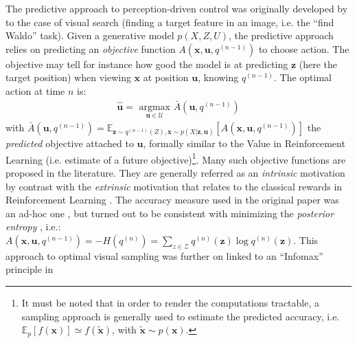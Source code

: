 \documentclass{article}
\begin{document}
The predictive approach to perception-driven control was originally developed by \cite{najemnik2005optimal} to the case of visual search (finding a target feature in an image, i.e. the ``find Waldo'' task).
Given a generative model $p(X,Z,U)$,  the predictive approach relies on predicting an \emph{objective} function $A(\boldsymbol{x}, \boldsymbol{u}, q^{(n-1)})$ to choose action. 
The objective may tell for instance how good the model is at predicting $\boldsymbol{z}$ (here the target position) when viewing $\boldsymbol{x}$ at position $\boldsymbol{u}$,
knowing $q^{(n-1)}$.
The optimal action at time $n$ is:
\begin{align*}
\hat{\boldsymbol{u}} = \underset{\boldsymbol{u} \in \mathcal{U}}{\text{ argmax }} \bar{A}(\boldsymbol{u}, q^{(n-1)})
\end{align*}
with $\bar{A}(\boldsymbol{u}, q^{(n-1)})
= \mathbb{E}_{\boldsymbol{z} \sim q^{(n-1)}(Z), \boldsymbol{x} \sim p(X|\boldsymbol{z}, \boldsymbol{u})}\left[A(\boldsymbol{x}, \boldsymbol{u}, q^{(n-1)})\right]$ the \emph{predicted} objective attached to $\boldsymbol{u}$, 
formally similar to the Value in Reinforcement Learning (i.e. estimate of a future objective)\footnote{It must be noted that in order to render the computations tractable, a sampling approach is generally used to estimate the predicted accuracy, i.e. $\mathbb{E}_p[f(\boldsymbol{x})] \simeq f(\tilde{\boldsymbol{x}})$, with $\tilde{\boldsymbol{x}}\sim p(\boldsymbol{x})$.}.
Many such objective functions are proposed in the literature. They are generally referred as an \emph{intrinsic} motivation \cite{oudeyer2008can} by contrast with the \emph{extrinsic} motivation that relates to the classical rewards in Reinforcement Learning \cite{sutton1998reinforcement}.
The accuracy measure used in the original paper was an ad-hoc one \cite{najemnik2005optimal}, but turned out to be consistent with minimizing the \emph{posterior entropy} \cite{najemnik2009simple}, i.e.:
$A(\boldsymbol{x}, \boldsymbol{u}, q^{(n-1)}) = -H(q^{(n)}) = \sum_{z \in \mathcal{Z}} q^{(n)}(\boldsymbol{z}) \log q^{(n)}(\boldsymbol{z})$. This approach to optimal visual sampling was further on linked to an ``Infomax'' principle in \cite{butko2010infomax} 
\end{document}
